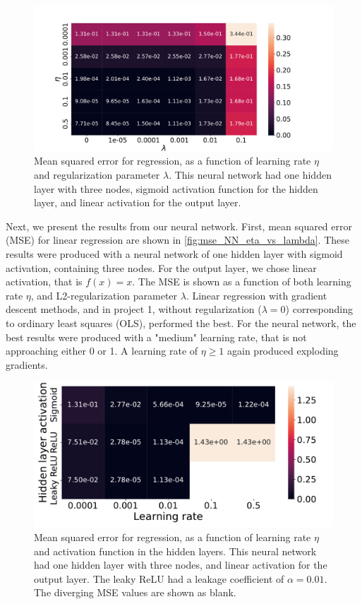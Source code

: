 \documentclass[12pt]{article}
\begin{document}
\begin{figure}
    \centering
    \includegraphics[width=0.91\linewidth]{images/mse_NN_eta_vs_lambda.pdf}
    \caption{Mean squared error for regression, as a function of learning rate $\eta$ and regularization parameter $\lambda$. This neural network had one hidden layer with three nodes, sigmoid activation function for the hidden layer, and linear activation for the output layer.}
    \label{fig:mse_NN_eta_vs_lambda}
\end{figure}

Next, we present the results from our neural network. First, mean squared error (MSE) for linear regression are shown in \autoref{fig:mse_NN_eta_vs_lambda}. These results were produced with a neural network of one hidden layer with sigmoid activation, containing three nodes. For the output layer, we chose linear activation, that is $f(x) = x$. The MSE is shown as a function of both learning rate $\eta$, and L2-regularization parameter $\lambda$. Linear regression with gradient descent methods, and in project 1, without regularization ($\lambda = 0$) corresponding to ordinary least squares (OLS), performed the best. For the neural network, the best results were produced with a "medium" learning rate, that is not approaching either 0 or 1. A learning rate of $\eta \geq 1$ again produced exploding gradients. 

\begin{figure}
    \centering
    \includegraphics[width=0.91\linewidth]{images/mse_NN_activation_vs_eta.pdf}
    \caption{Mean squared error for regression, as a function of learning rate $\eta$ and activation function in the hidden layers. This neural network had one hidden layer with three nodes, and linear activation for the output layer. The leaky ReLU had a leakage coefficient of $\alpha = 0.01$. The diverging MSE values are shown as blank.}
    \label{fig:mse_NN_activation_vs_eta}
\end{figure}
\end{document}
